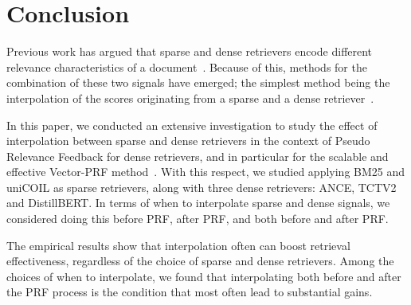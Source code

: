 \vspace{-5pt}
\section{Conclusion}
Previous work has argued that sparse and dense retrievers encode different relevance characteristics of a document~\cite{lin2020pretrained,wang2021bert}. Because of this, methods for the combination of these two signals have emerged; the simplest method being the interpolation of the scores originating from a sparse and a dense retriever~\cite{wang2021bert}.

In this paper, we conducted an extensive investigation to study the effect of interpolation between sparse and dense retrievers in the context of Pseudo Relevance Feedback for dense retrievers, and in particular for the scalable and effective Vector-PRF method~\cite{li2021pseudo}. 
With this respect, we studied applying BM25 and uniCOIL as sparse retrievers, along with three dense retrievers: ANCE, TCTV2 and DistillBERT. In terms of when to interpolate sparse and dense signals, we considered doing this before PRF, after PRF, and both before and after PRF.


The empirical results show that interpolation often can boost retrieval effectiveness, regardless of the choice of sparse and dense retrievers. Among the choices of when to interpolate, we found that interpolating both before and after the PRF process is the condition that most often lead to substantial gains.


